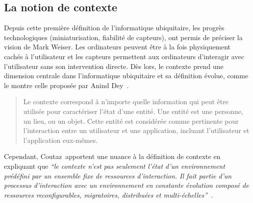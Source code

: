 \subsection{La notion de contexte}
Depuis cette première définition de l'informatique ubiquitaire, les
progrès technologiques (miniaturisation, fiabilité de capteurs), ont
permis de préciser la vision de Mark Weiser. Les ordinateurs peuvent
être à la fois physiquement cachés à l'utilisateur et les capteurs
permettent aux ordinateurs d'interagir avec l'utilisateur sans son
intervention directe. Dès lors, le contexte prend une dimension
centrale dans l'informatique ubiquitaire et sa définition évolue,
comme le montre celle proposée par Anind Dey~\parencite{dey2001understanding}.

\begin{quote}
  Le contexte correspond à n’importe quelle information qui peut être
  utilisée pour caractériser l’état d’une entité. Une entité est une
  personne, un lieu, ou un objet. Cette entité est considérée comme
  pertinente pour l’interaction entre un utilisateur et une
  application, incluant l’utilisateur et l’application eux-mêmes.
\end{quote}

Cependant, Coutaz~\etal apportent une nuance à la
définition de contexte en expliquant que {\it``le contexte n'est pas
  seulement l'état d'un environnement prédéfini par un ensemble fixe
  de ressources d'interaction. Il fait partie d'un processus
  d'interaction avec un environnement en constante évolution composé
  de ressources reconfigurables, migratoires, distribuées et
  multi-échelles''}~\parencite{coutaz2005context}. 

